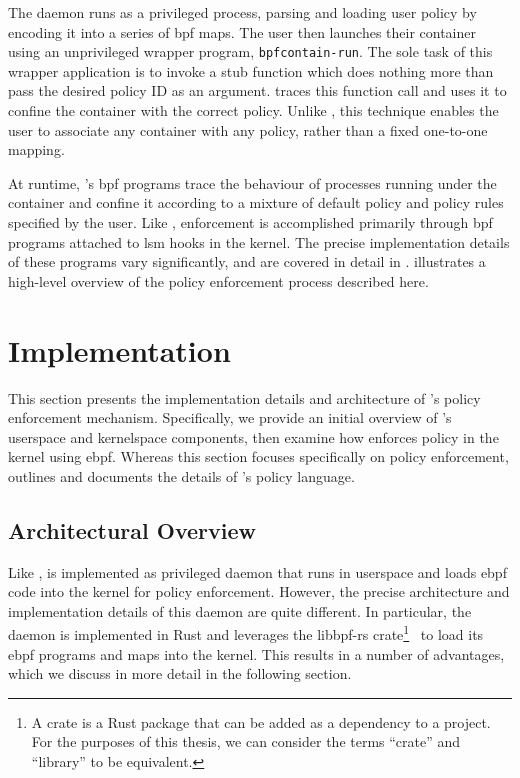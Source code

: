 The \bpfcontain{} daemon runs as a privileged process, parsing and loading user policy by
encoding it into a series of \gls{bpf} maps. The user then launches their container using
an unprivileged wrapper program, \texttt{bpfcontain-run}. The sole task of this wrapper
application is to invoke a stub function which does nothing more than pass the desired
policy ID as an argument. \bpfcontain{} traces this function call and uses it to confine
the container with the correct policy. Unlike \bpfbox{}, this technique enables the user
to associate any container with any policy, rather than a fixed one-to-one mapping.

At runtime, \bpfcontain{}'s \gls{bpf} programs trace the behaviour of processes running
under the container and confine it according to a mixture of default policy and policy
rules specified by the user. Like \bpfbox{}, enforcement is accomplished primarily through
\gls{bpf} programs attached to \gls{lsm} hooks in the kernel. The precise implementation
details of these programs vary significantly, and are covered in detail in
.  illustrates
a high-level overview of the policy enforcement process described here.



\section{\bpfcontain{} Implementation}%
\label{s:bpfcontain-implementation}

This section presents the implementation details and architecture of \bpfcontain{}'s
policy enforcement mechanism. Specifically, we provide an initial overview of
\bpfcontain{}'s userspace and kernelspace components, then examine how \bpfcontain{}
enforces policy in the kernel using \gls{ebpf}. Whereas this section focuses specifically
on policy enforcement,  outlines and documents the details of
\bpfcontain{}'s policy language.

\subsection{Architectural Overview}%
\label{ss:bpfcontain-architecture}

Like \bpfbox{}, \bpfcontain{} is implemented as privileged daemon that runs in userspace
and loads \gls{ebpf} code into the kernel for policy enforcement. However, the precise
architecture and implementation details of this daemon are quite different. In particular,
the daemon is implemented in Rust and leverages the libbpf-rs crate\footnote{A crate is
a Rust package that can be added as a dependency to a project. For the purposes of this
thesis, we can consider the terms \enquote{crate} and \enquote{library} to be
equivalent.}~\cite{libbpf-rs} to load its \gls{ebpf} programs and maps into the kernel.
This results in a number of advantages, which we discuss in more detail in the following
section.

